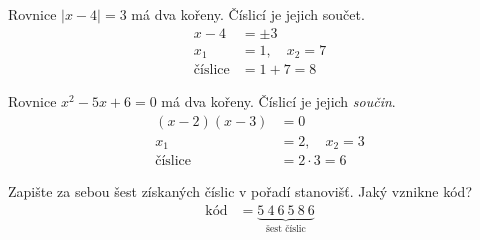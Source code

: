 \documentclass[11pt,a4paper]{article}
\begin{document}
\begin{prikladReseniBox}[title={Příklad 6}]
Rovnice $|x-4|=3$ má dva kořeny. Číslicí je jejich součet.
\tcblower
\[
\begin{aligned}
x-4&=\pm3\\
x_1&=1,\quad x_2=7\\
\text{číslice}&=1+7=8
\end{aligned}
\]

\end{prikladReseniBox}
\begin{prikladReseniBox}[title={Příklad 7}]
Rovnice $x^2-5x+6=0$ má dva kořeny. Číslicí je jejich \emph{součin}.
\tcblower
\[
\begin{aligned}
(x-2)(x-3)&=0\\
x_1&=2,\quad x_2=3\\
\text{číslice}&=2\cdot3=6
\end{aligned}
\]

\end{prikladReseniBox}
\begin{zadaniReseniBox}[title={Samostatná práce 1}]
Zapište za sebou šest získaných číslic v pořadí stanovišť. Jaký vznikne kód?
\tcblower
\[
\begin{aligned}
\text{kód}&=\underbrace{5\ 4\ 6\ 5\ 8\ 6}_{\text{šest číslic}}
\end{aligned}
\]

\end{zadaniReseniBox}
\end{document}
